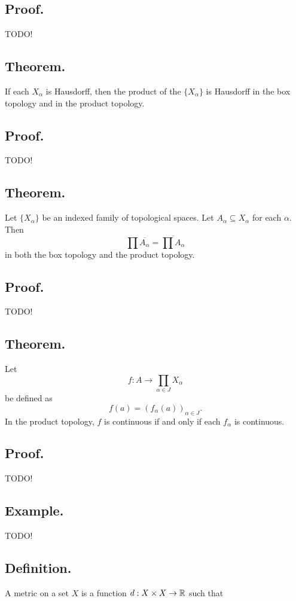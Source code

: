 \documentclass[titlepage]{article}
\begin{document}
\subsection{Proof.} TODO!

\subsection{Theorem.} If each $X_{\alpha}$ is Hausdorff, then the product of the $\{X_{\alpha}\}$ is Hausdorff in the box topology and in the product topology.

\subsection{Proof.} TODO!

\subsection{Theorem.} Let $\{X_{\alpha}\}$ be an indexed family of topological spaces. Let $A_{\alpha} \subseteq X_{\alpha}$ for each $\alpha$. Then 
$$\prod \overline{A_{\alpha}} = \overline{\prod A_{\alpha}}$$
in both the box topology and the product topology.

\subsection{Proof.} TODO!

\subsection{Theorem.} Let 
$$f: A \to \prod_{\alpha \in J} X_{\alpha}$$
be defined as 
$$f(a) = (f_{\alpha}(a))_{\alpha \in J}.$$
In the product topology, $f$ is continuous if and only if each $f_{\alpha}$ is continuous.

\subsection{Proof.} TODO!

\subsection{Example.} TODO!

\subsection{Definition.} A metric on a set $X$ is a function $d: X \times X \to \mathbb{R}$ such that 
\end{document}
